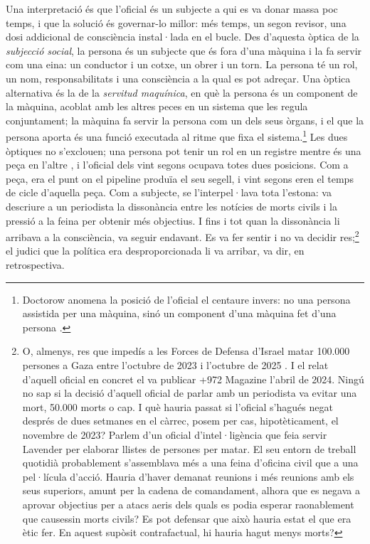 Una interpretació és que l'oficial és un subjecte a qui es va donar massa poc temps, i que la solució és governar-lo millor: més temps, un segon revisor, una dosi addicional de consciència instal·lada en el bucle. Des d'aquesta òptica de la \emph{subjecció social}, la persona és un subjecte que és fora d'una màquina i la fa servir com una eina: un conductor i un cotxe, un obrer i un torn. La persona té un rol, un nom, responsabilitats i una consciència a la qual es pot adreçar. Una òptica alternativa és la de la \emph{servitud maquínica}, en què la persona és un component de la màquina, acoblat amb les altres peces en un sistema que les regula conjuntament; la màquina fa servir la persona com un dels seus òrgans, i el que la persona aporta és una funció executada al ritme que fixa el sistema.\footnote{Doctorow anomena la posició de l'oficial el centaure invers: no una persona assistida per una màquina, sinó un component d'una màquina fet d'una persona \autocite{doctorow2026reversecentaur}.} Les dues òptiques no s'exclouen; una persona pot tenir un rol en un registre mentre és una peça en l'altre \autocite[Altiplà 13, «The Apparatus of Capture»: hi ha servitud quan els éssers humans són ells mateixos peces constituents d'una màquina que componen entre ells i amb altres coses, sota el control i la direcció d'una unitat superior, i subjecció quan la unitat superior constitueix l'ésser humà com a subjecte vinculat a un nou objecte exterior, que pot ser un animal, una eina o fins i tot una màquina]{deleuze1987plateaus}, i l'oficial dels vint segons ocupava totes dues posicions. Com a peça, era el punt on el pipeline produïa el seu segell, i vint segons eren el temps de cicle d'aquella peça. Com a subjecte, se l'interpel·lava tota l'estona: va descriure a un periodista la dissonància entre les notícies de morts civils i la pressió a la feina per obtenir més objectius. I fins i tot quan la dissonància li arribava a la consciència, va seguir endavant. Es va fer sentir i no va decidir res;\footnote{O, almenys, res que impedís a les Forces de Defensa d'Israel matar 100.000 persones a Gaza entre l'octubre de 2023 i l'octubre de 2025 \autocite{gomezugarte2025uncertainty,acosta2026gaza,economist2025gaza}. I el relat d'aquell oficial en concret el va publicar +972 Magazine l'abril de 2024. Ningú no sap si la decisió d'aquell oficial de parlar amb un periodista va evitar una mort, 50.000 morts o cap. I què hauria passat si l'oficial s'hagués negat després de dues setmanes en el càrrec, posem per cas, hipotèticament, el novembre de 2023? Parlem d'un oficial d'intel·ligència que feia servir Lavender per elaborar llistes de persones per matar. El seu entorn de treball quotidià probablement s'assemblava més a una feina d'oficina civil que a una pel·lícula d'acció. Hauria d'haver demanat reunions i més reunions amb els seus superiors, amunt per la cadena de comandament, alhora que es negava a aprovar objectius per a atacs aeris dels quals es podia esperar raonablement que causessin morts civils? Es pot defensar que això hauria estat el que era ètic fer. En aquest supòsit contrafactual, hi hauria hagut menys morts?} el judici que la política era desproporcionada li va arribar, va dir, en retrospectiva.

